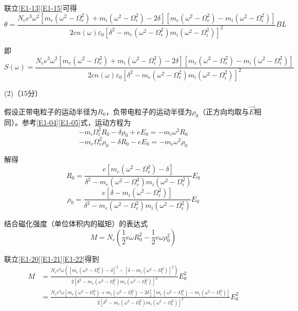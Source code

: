 \documentclass[10pt,a4paper,onecolumn,UTF8]{ctexart}
\begin{document}
	联立\eqref{E1-13}\eqref{E1-15}可得
	\begin{equation}
		\theta=\frac{N_ce^3\omega^2\left[m_e(\omega^2-\Omega_e^2)+m_i(\omega^2-\Omega_i^2)-2\delta\right]\left[m_e(\omega^2-\Omega_e^2)-m_i(\omega^2-\Omega_i^2)\right]}{2cn(\omega)\varepsilon_0\left[\delta^2-m_e(\omega^2-\Omega_e^2)m_i(\omega^2-\Omega_i^2)\right]^2}BL
	\end{equation}
	
	即
	\begin{equation}\label{E1-17}
		S(\omega)=\frac{N_ce^3\omega^2\left[m_e(\omega^2-\Omega_e^2)+m_i(\omega^2-\Omega_i^2)-2\delta\right]\left[m_e(\omega^2-\Omega_e^2)-m_i(\omega^2-\Omega_i^2)\right]}{2cn(\omega)\varepsilon_0\left[\delta^2-m_e(\omega^2-\Omega_e^2)m_i(\omega^2-\Omega_i^2)\right]^2}
	\end{equation}
	
	(2)（15分）
	
	假设正带电粒子的运动半径为$R_0$，负带电粒子的运动半径为$\rho_0$（正方向均取与$\vec E$相同）。参考\eqref{E1-04}\eqref{E1-05}式，运动方程为
	\begin{equation}
		-m_i\Omega_i^2 R_0-\delta\rho_0+e E_0=-m_i\omega^2R_0
	\end{equation}
	\begin{equation}
		-m_e\Omega_e^2\rho_0-\delta R_0-e E_0=-m_e\omega^2\rho_0
	\end{equation}
	
	解得
	\begin{equation}\label{E1-20}
		R_0=\frac{e\left[m_e(\omega^2-\Omega_e^2)-\delta\right]}{\delta^2-m_e(\omega^2-\Omega_e^2)m_i(\omega^2-\Omega_i^2)}E_0
	\end{equation}
	\begin{equation}\label{E1-21}
		\rho_0=\frac{e\left[\delta-m_i(\omega^2-\Omega_i^2)\right]}{\delta^2-m_e(\omega^2-\Omega_e^2)m_i(\omega^2-\Omega_i^2)}E_0
	\end{equation}
	
	结合磁化强度（单位体积内的磁矩）的表达式
	\begin{equation}\label{E1-22}
		M=N_c(\frac 1 2 e\omega R_0^2-\frac 1 2 e\omega\rho_0^2)
	\end{equation}
	
	联立\eqref{E1-20}\eqref{E1-21}\eqref{E1-22}得到
	\begin{equation}
		\begin{aligned}
			M&=\frac{N_ce^3\omega\left(\left[m_e(\omega^2-\Omega_e^2)-\delta\right]^2-\left[\delta-m_i(\omega^2-\Omega_i^2)\right]^2\right)}{2\left[\delta^2-m_e(\omega^2-\Omega_e^2)m_i(\omega^2-\Omega_i^2)\right]^2}E_0^2\\
			&=\frac{N_ce^3\omega\left[m_e(\omega^2-\Omega_e^2)+m_i(\omega^2-\Omega_i^2)-2\delta\right]\left[m_e(\omega^2-\Omega_e^2)-m_i(\omega^2-\Omega_i^2)\right]}{2\left[\delta^2-m_e(\omega^2-\Omega_e^2)m_i(\omega^2-\Omega_i^2)\right]^2}E_0^2
		\end{aligned}
	\end{equation}
	
\end{document}
